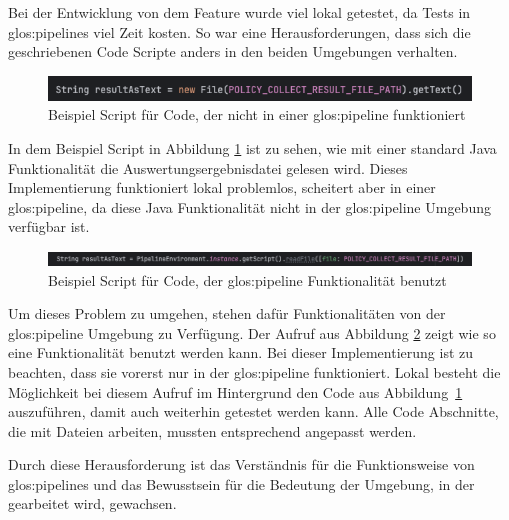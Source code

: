 \documentclass[../main.tex]{subfiles}
\begin{document}
Bei der Entwicklung von dem Feature wurde viel lokal getestet, da Tests in \glspl{glos:pipeline} viel Zeit kosten.
So war eine Herausforderungen, dass sich die geschriebenen Code Scripte anders in den beiden Umgebungen verhalten.

\begin{figure}[ht]
    \centering
    \includegraphics[scale=0.45]{bilder/codebad.png}
    \caption{Beispiel Script für Code, der nicht in einer \gls{glos:pipeline} funktioniert}
    \label{fig:codebad}
\end{figure}


In dem Beispiel Script in Abbildung \ref{fig:codebad} ist zu sehen, wie mit einer standard Java Funktionalität die Auswertungsergebnisdatei gelesen wird.
Dieses Implementierung funktioniert lokal problemlos, scheitert aber in einer \gls{glos:pipeline}, da diese Java Funktionalität nicht in der \gls{glos:pipeline} Umgebung verfügbar ist.

\begin{figure}[ht]
    \centering
    \includegraphics[scale=0.45]{bilder/codegood.png}
    \caption{Beispiel Script für Code, der \gls{glos:pipeline} Funktionalität benutzt}
    \label{fig:codegood}
\end{figure}
        
Um dieses Problem zu umgehen, stehen dafür Funktionalitäten von der \gls{glos:pipeline} Umgebung zu Verfügung.
Der Aufruf aus Abbildung \ref{fig:codegood} zeigt wie so eine Funktionalität benutzt werden kann.
Bei dieser Implementierung ist zu beachten, dass sie vorerst nur in der \gls{glos:pipeline} funktioniert.
Lokal besteht die Möglichkeit bei diesem Aufruf im Hintergrund den Code aus Abbildung \ref{fig:codebad} auszuführen, damit auch weiterhin getestet werden kann.
Alle Code Abschnitte, die mit Dateien arbeiten, mussten entsprechend angepasst werden.

Durch diese Herausforderung ist das Verständnis für die Funktionsweise von \glspl{glos:pipeline} und das Bewusstsein für die Bedeutung der Umgebung, in der gearbeitet wird, gewachsen.
\end{document}
